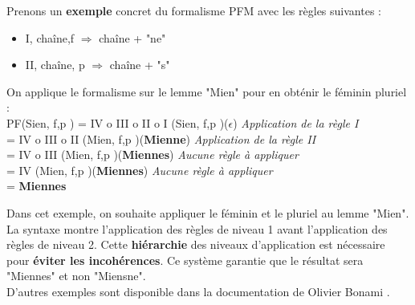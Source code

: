 Prenons un \textbf{exemple} concret du formalisme PFM avec les règles suivantes : \\
\begin{itemize}
    \item I, chaîne,{f} $\Longrightarrow$ chaîne + "ne"
    \item II, chaîne, {p} $\Longrightarrow$ chaîne + "s"
\end{itemize}


On applique le formalisme sur le lemme "Mien" pour en obténir le féminin pluriel : \\
PF(Sien, {f,p} ) = IV o III o II o I (Sien, {f,p} )(\textbf{$\epsilon$}) \textit{Application de la règle I} \\
                 = IV o III o II (Mien, {f,p} )(\textbf{Mienne}) \textit{Application de la règle II} \\
                 = IV o III (Mien, {f,p} )(\textbf{Miennes}) \textit{Aucune règle à appliquer} \\
                 = IV (Mien, {f,p} )(\textbf{Miennes}) \textit{Aucune règle à appliquer} \\
                 =\textbf{ Miennes }

Dans cet exemple, on souhaite appliquer le féminin et le pluriel au lemme "Mien".
La syntaxe montre l'application des règles de niveau 1 avant l'application des règles de niveau 2.
Cette \textbf{hiérarchie} des niveaux d'application est nécessaire pour \textbf{éviter les incohérences}. Ce système garantie que le résultat sera "Miennes" et non "Miensne". \\
D'autres exemples sont disponible dans la documentation de Olivier Bonami \cite{PFM}.
